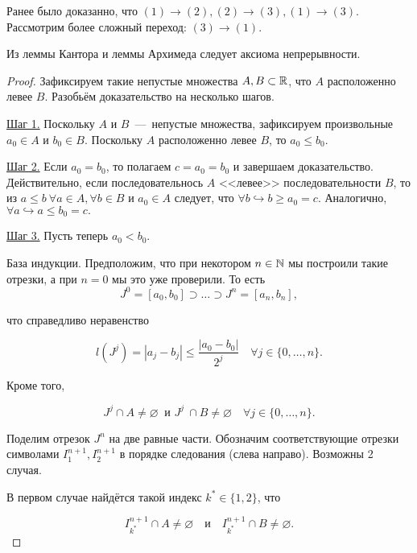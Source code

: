     \begin{note}
        Ранее было доказанно, что $(1) \rightarrow (2), (2) \rightarrow (3), (1) \rightarrow (3).$ Рассмотрим более сложный переход: $(3) \rightarrow (1).$
    \end{note}
    \begin{theorem}
        Из леммы Кантора и леммы Архимеда следует аксиома непрерывности.
    \end{theorem}
    \begin{proof}
        Зафиксируем такие непустые множества $A, B \subset \mathbb{R}$, что $A$ расположенно левее $B.$ Разобьём доказательство на несколько шагов.
        
        \underline{Шаг 1.} Поскольку $A$ и $B$~---~непустые множества, зафиксируем произвольные $a_{0} \in A$ и $b_{0} \in B.$ Поскольку $A$ расположенно левее $B$, то $a_{0} \leq b_{0}.$

        \underline{Шаг 2.} Если $a_{0} = b_{0}$, то полагаем $c = a_{0} = b_{0}$ и завершаем доказательство. Действительно, если последовательнось $A$ <<левее>> последовательности $B$, то из $a \leq b \  \forall a \in A, \forall b \in B$ и $a_{0} \in A$ следует, что $\forall b \hookrightarrow b \geq a_{0} = c.$ Аналогично, $\forall a \hookrightarrow a \leq b_{0} = c.$

        \underline{Шаг 3.} Пусть теперь $a_{0} < b_{0}.$

        База индукции. Предположим, что при некотором $n \in \mathbb{N}$ мы построили такие отрезки, а при $n = 0$ мы это уже проверили. То есть
        $$ J^{0} = [a_{0}, b_{0}] \supset \ldots \supset J^{n} = [a_{n}, b_{n}],$$

        что справедливо неравенство

        $$\displaystyle l(J^{j}) = |a_{j} - b_{j}| \leq \frac{|a_{0} - b_{0}|}{2^{j}} \quad \forall j \in \{ 0, \dots, n \}.$$

        Кроме того,

        $$ J^{j} \cap A \neq \varnothing \  \text{ и  } J^{j} \    \cap B \neq \varnothing \quad \forall j \in \{ 0, \dots, n \}.$$

        Поделим отрезок $J^{n}$ на две равные части. Обозначим соответствующие отрезки символами $I^{n+1}_{1}, I^{n+1}_{2}$ в порядке следования (слева направо). Возможны 2 случая.

        В первом случае найдётся такой индекс $k^{*} \in \{ 1, 2\}$, что

        $$ I^{n + 1}_{k^{*}} \cap A \neq \varnothing \quad \text{и} \quad I^{n + 1}_{k^{*}} \cap B \neq \varnothing .$$


\end{proof}
